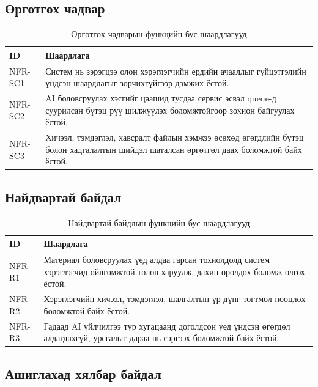 \subsection{Өргөтгөх чадвар}

\begin{table}[H]
\centering
\begin{tabular}{|p{3cm}|p{11cm}|}
\hline
\textbf{ID} & \textbf{Шаардлага} \\ \hline
NFR-SC1 & Систем нь зэрэгцээ олон хэрэглэгчийн ердийн ачааллыг гүйцэтгэлийн үндсэн шаардлагыг зөрчихгүйгээр дэмжих ёстой. \\ \hline
NFR-SC2 & AI боловсруулах хэсгийг цаашид тусдаа сервис эсвэл queue-д суурилсан бүтэц рүү шилжүүлэх боломжтойгоор зохион байгуулах ёстой. \\ \hline
NFR-SC3 & Хичээл, тэмдэглэл, хавсралт файлын хэмжээ өсөхөд өгөгдлийн бүтэц болон хадгалалтын шийдэл шаталсан өргөтгөл даах боломжтой байх ёстой. \\ \hline
\end{tabular}
\caption{Өргөтгөх чадварын функцийн бус шаардлагууд}
\end{table}

\subsection{Найдвартай байдал}

\begin{table}[H]
\centering
\begin{tabular}{|p{3cm}|p{11cm}|}
\hline
\textbf{ID} & \textbf{Шаардлага} \\ \hline
NFR-R1 & Материал боловсруулах үед алдаа гарсан тохиолдолд систем хэрэглэгчид ойлгомжтой төлөв харуулж, дахин оролдох боломж олгох ёстой. \\ \hline
NFR-R2 & Хэрэглэгчийн хичээл, тэмдэглэл, шалгалтын үр дүнг тогтмол нөөцлөх боломжтой байх ёстой. \\ \hline
NFR-R3 & Гадаад AI үйлчилгээ түр хугацаанд доголдсон үед үндсэн өгөгдөл алдагдахгүй, урсгалыг дараа нь сэргээх боломжтой байх ёстой. \\ \hline
\end{tabular}
\caption{Найдвартай байдлын функцийн бус шаардлагууд}
\end{table}

\subsection{Ашиглахад хялбар байдал}

